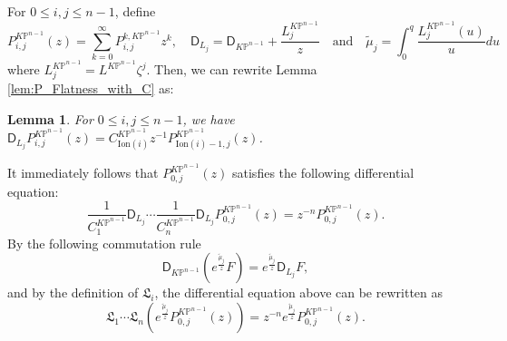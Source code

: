 \documentclass[12pt]{amsart}
\newtheorem{lem}[prop]{Lemma}
\numberwithin{equation}{section}
\newcommand{\KP}{K\mathbb{P}}
\begin{document}
For $0\leq{i,j}\leq{n-1}$, define
\begin{equation}\label{eqn:DLj_mutildej}
P_{i,j}^{\KP^{n-1}}(z)=\sum_{k=0}^{\infty} P_{i,j}^{k,\KP^{n-1}} z^{k},\quad \mathsf{D}_{L_j}=\mathsf{D}_{\KP^{n-1}}+\frac{L^{\KP^{n-1}}_j}{z} \quad\text{and}\quad \widetilde{\mu}_j=\int_0^q\frac{L^{\KP^{n-1}}_j(u)}{u}du
\end{equation}
where $L_j^{\KP^{n-1}}=L^{\KP^{n-1}}\zeta^j$. Then, we can rewrite Lemma \ref{lem:P_Flatness_with_C} as:
\begin{lem}
For $0\leq{i,j}\leq{n-1}$, we have
$\mathsf{D}_{L_j}P_{i,j}^{\KP^{n-1}}(z)=C^{\KP^{n-1}}_{\mathrm{Ion}(i)}z^{-1}P_{\mathrm{Ion}(i)-1,j}^{\KP^{n-1}}(z)$.
\end{lem}
It immediately follows that $P_{0,j}^{\KP^{n-1}}(z)$ satisfies the following differential equation:
\begin{equation*}
\frac{1}{C^{\KP^{n-1}}_1}\mathsf{D}_{L_j} \cdots \frac{1}{C^{\KP^{n-1}}_n}\mathsf{D}_{L_j}P_{0,j}^{\KP^{n-1}}(z)=z^{-n}P^{\KP^{n-1}}_{0,j}(z).
\end{equation*}
By the following commutation rule
\begin{equation}\label{eqn:Commutation_of_DL}
\mathsf{D}_{\KP^{n-1}}(e^{\frac{\widetilde{\mu}_{j}}{z}}F)=e^{\frac{\widetilde{\mu}_{j}}{z}}\mathsf{D}_{L_j}F,
\end{equation}
and by the definition of $\mathfrak{L}_i$, the differential equation above can be rewritten as 
\begin{equation}\label{eqn:P0jODE}
\mathfrak{L}_1\cdots\mathfrak{L}_n\left(e^{\frac{\widetilde{\mu}_{j}}{z}}P_{0,j}^{\KP^{n-1}}(z)\right)=z^{-n}e^{\frac{\widetilde{\mu}_{j}}{z}}P_{0,j}^{\KP^{n-1}}(z).
\end{equation}
\end{document}
